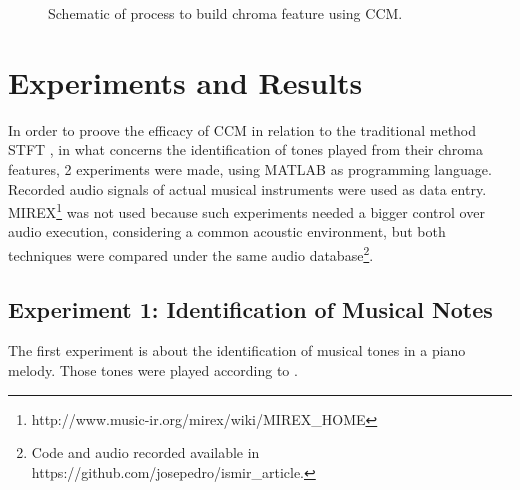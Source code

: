 \documentclass{article}
\begin{document}
	\begin{figure}[h!]
	 \centerline{}
	 \caption{Schematic of process to build chroma feature using CCM.}
	 \label{fig:schematic}
	\end{figure}


\section{Experiments and Results}

	In order to proove the efficacy of CCM in relation to the traditional method STFT \cite{LabROSA}, in what concerns the identification of tones played from their chroma features, 2 experiments were made, using MATLAB as programming language. Recorded audio signals of actual musical instruments were used as data entry. MIREX\footnote{http://www.music-ir.org/mirex/wiki/MIREX\_HOME} was not used because such experiments needed a bigger control over audio execution, considering a common acoustic environment, but both techniques were compared under the same audio database\footnote{Code and audio recorded available in https://github.com/josepedro/ismir\_article.}. 

	
	\subsection{Experiment 1: Identification of Musical Notes}

	The first experiment is about the identification of musical tones in a piano melody. Those tones were played according to .
\end{document}
